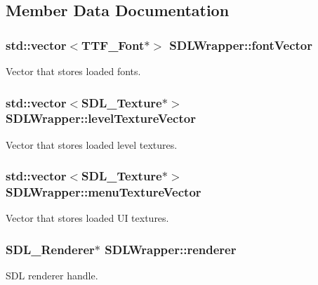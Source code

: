 \subsection{Member Data Documentation}
\subsubsection[{\texorpdfstring{font\+Vector}{fontVector}}]{\setlength{\rightskip}{0pt plus 5cm}std\+::vector$<$T\+T\+F\+\_\+\+Font$\ast$$>$ S\+D\+L\+Wrapper\+::font\+Vector}\hypertarget{class_s_d_l_wrapper_a38b81e2c2a6b5e435b22dbda32d1fb7e}{}\label{class_s_d_l_wrapper_a38b81e2c2a6b5e435b22dbda32d1fb7e}
Vector that stores loaded fonts. 
\subsubsection[{\texorpdfstring{level\+Texture\+Vector}{levelTextureVector}}]{\setlength{\rightskip}{0pt plus 5cm}std\+::vector$<$S\+D\+L\+\_\+\+Texture$\ast$$>$ S\+D\+L\+Wrapper\+::level\+Texture\+Vector}\hypertarget{class_s_d_l_wrapper_a7dbd8ea0a1d91fcf91aa7e6a467d1344}{}\label{class_s_d_l_wrapper_a7dbd8ea0a1d91fcf91aa7e6a467d1344}
Vector that stores loaded level textures. 
\subsubsection[{\texorpdfstring{menu\+Texture\+Vector}{menuTextureVector}}]{\setlength{\rightskip}{0pt plus 5cm}std\+::vector$<$S\+D\+L\+\_\+\+Texture$\ast$$>$ S\+D\+L\+Wrapper\+::menu\+Texture\+Vector}\hypertarget{class_s_d_l_wrapper_abfc9572c6ae83287acab8e1c12edf438}{}\label{class_s_d_l_wrapper_abfc9572c6ae83287acab8e1c12edf438}
Vector that stores loaded UI textures. 
\subsubsection[{\texorpdfstring{renderer}{renderer}}]{\setlength{\rightskip}{0pt plus 5cm}S\+D\+L\+\_\+\+Renderer$\ast$ S\+D\+L\+Wrapper\+::renderer}\hypertarget{class_s_d_l_wrapper_a743f32054f626218636044f2159bf39d}{}\label{class_s_d_l_wrapper_a743f32054f626218636044f2159bf39d}
S\+DL renderer handle. 

